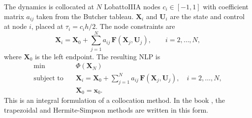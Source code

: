The dynamics is collocated at $N$ LobattoIIIA nodes $c_i \in [-1,1]$ with coefficient matrix $a_{ij}$ taken from the Butcher tableau. $\mathbf{X}_i$ and $\mathbf{U}_i$ are the state and control at node $i$, placed at $\tau_i = c_i h/2$. The node constraints are
\begin{equation}
    \mathbf{X}_i = \mathbf{X}_0 +  \sum_{j=1}^{N} a_{ij}\, \mathbf{F}(\mathbf{X}_j, \mathbf{U}_j), \qquad i = 2, \dots, N,
\label{eq:lobattoIIIA-stage}
\end{equation}
where $\mathbf{X}_0$ is the left endpoint.
The resulting NLP is
\begin{equation}
\begin{aligned}
\min \quad & \Phi(\mathbf{X}_N) \\
\text{subject to} \quad & \mathbf{X}_i = \mathbf{X}_0 +  \sum_{j=1}^{N} a_{ij}\, \mathbf{F}(\mathbf{X}_j, \mathbf{U}_j), \quad i = 2, \dots, N, \\
& \mathbf{X}_0 = \mathbf{x}_0.
\end{aligned}
\end{equation}
This is an integral formulation of a collocation method. In the book \cite{betts}, the trapezoidal and Hermite-Simpson methods are written in this form.


